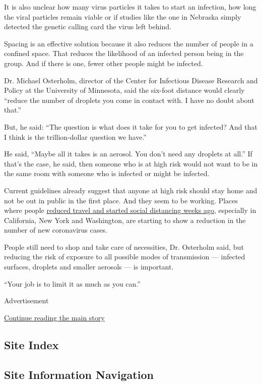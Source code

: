 It is also unclear how many virus particles it takes to start an
infection, how long the viral particles remain viable or if studies like
the one in Nebraska simply detected the genetic calling card the virus
left behind.

Spacing is an effective solution because it also reduces the number of
people in a confined space. That reduces the likelihood of an infected
person being in the group. And if there is one, fewer other people might
be infected.

Dr. Michael Osterholm, director of the Center for Infectious Disease
Research and Policy at the University of Minnesota, said the six-foot
distance would clearly ``reduce the number of droplets you come in
contact with. I have no doubt about that.''

But, he said: ``The question is what does it take for you to get
infected? And that I think is the trillion-dollar question we have.''

He said, ``Maybe all it takes is an aerosol. You don't need any droplets
at all.'' If that's the case, he said, then someone who is at high risk
would not want to be in the same room with someone who is infected or
might be infected.

Current guidelines already suggest that anyone at high risk should stay
home and not be out in public in the first place. And they seem to be
working. Places where people
\href{https://www.nytimes3xbfgragh.onion/interactive/2020/04/02/us/coronavirus-social-distancing.html}{reduced
travel and started social distancing weeks ago}, especially in
California, New York and Washington, are starting to show a reduction in
the number of new coronavirus cases.

People still need to shop and take care of necessities, Dr. Osterholm
said, but reducing the risk of exposure to all possible modes of
transmission --- infected surfaces, droplets and smaller aerosols --- is
important.

``Your job is to limit it as much as you can.''

Advertisement

\protect\hyperlink{after-bottom}{Continue reading the main story}

\hypertarget{site-index}{%
\subsection{Site Index}\label{site-index}}

\hypertarget{site-information-navigation}{%
\subsection{Site Information
Navigation}\label{site-information-navigation}}

